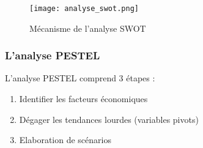     \bigskip
    
    \begin{figure}[H]
      \begin{center}
	\texttt{[image: analyse\_swot.png]}
	\caption{Mécanisme de l'analyse SWOT}
      \end{center}
    \end{figure}
    
    \bigskip
    
    \subsubsection{L'analyse PESTEL}
    
    L'analyse PESTEL comprend 3 étapes :
    
    \begin{enumerate}
     \item Identifier les facteurs économiques
     \item Dégager les tendances lourdes (variables pivots)
     \item Elaboration de scénarios
    \end{enumerate}
    
    \begin{center}
    \end{center} \bigskip
    
